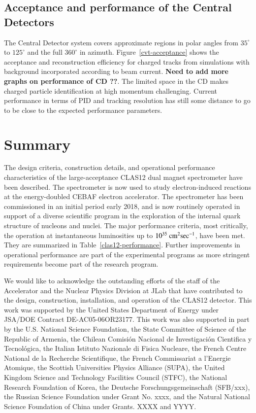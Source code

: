 \documentclass[final,3p,times,twocolumn,authoryear]{elsarticle}
\begin{document}
\subsection{\rm Acceptance and performance of the Central Detectors} 

The Central Detector system covers approximate regions in polar angles from $35^\circ$ to $125^\circ$ and 
the full $360^\circ$ in azimuth.  Figure~\ref{cvt-acceptance} shows the acceptance 
and reconstruction efficiency for charged tracks from simulations with background incorporated according to beam current. 
  {\bf Need to add more graphs on performance of CD ??}. The limited space in the CD makes charged particle identification 
  at high momentum challenging. Current performance in terms of PID and tracking resolution has still some distance to go to 
  be close to the expected performance parameters.   


\section{Summary} 
The design criteria, construction details, and operational performance characteristics of the large-acceptance CLAS12 dual 
magnet spectrometer have been described. The spectrometer is now used to study 
electron-induced reactions at the energy-doubled CEBAF electron accelerator. The spectrometer has been commissioned 
in an initial period early 2018, and is now routinely 
operated in support of a diverse scientific program in the exploration of the internal quark structure of nucleons and nuclei. 
The major performance criteria, most critically, the operation at  instantaneous luminosities up to 
$10^{35}\rm~{cm^2}\rm{sec^{-1}}$, have been met. They are summarized in Table~\ref{clas12-performance}. Further improvements 
in operational performance are part of the experimental programs as more stringent requirements become part of the 
research program.  

\vspace{0,5cm}


\vspace{0.3cm}

We would like to acknowledge the outstanding efforts of the staff of the Accelerator and the Nuclear Physics Division at JLab that have 
contributed to the design, construction, installation, and operation of the CLAS12 detector.  This work was supported by the United States Department of Energy under JSA/DOE Contract DE-AC05-06OR23177. This work was also supported in part by the U.S. National Science Foundation, the State Committee of Science of the Republic of Armenia, the Chilean Comisi\'on Nacional de Investigaci\'on Cientifica y Tecnol\'ogica, the Italian Istituto Nazionale di Fisica Nucleare, the French Centre National de la Recherche Scientifique, the French Commissariat a l'Energie Atomique, the Scottish Universities Physics Alliance (SUPA), the United Kingdom Science and Technology Facilities Council (STFC), the National Research Foundation of Korea, the Deutsche Forschungsgemeinschaft (SFB/xxx), the Russian Science Foundation under Grant No. xxxx, and the Natural National Science Foundation of China under Grants. XXXX and YYYY. 
\end{document}
